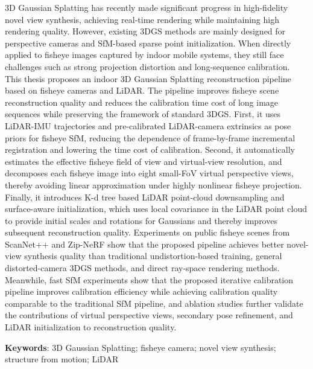 3D Gaussian Splatting has recently made significant progress in high-fidelity novel view synthesis, achieving real-time rendering while maintaining high rendering quality.
However, existing 3DGS methods are mainly designed for perspective cameras and SfM-based sparse point initialization. When directly applied to fisheye images captured by indoor mobile systems, they still face challenges such as strong projection distortion and long-sequence calibration. 
This thesis proposes an indoor 3D Gaussian Splatting reconstruction pipeline based on fisheye cameras and LiDAR. 
The pipeline improves fisheye scene reconstruction quality and reduces the calibration time cost of long image sequences while preserving the framework of standard 3DGS. 
First, it uses LiDAR-IMU trajectories and pre-calibrated LiDAR-camera extrinsics as pose priors for fisheye SfM, reducing the dependence of frame-by-frame incremental registration and lowering the time cost of calibration. 
Second, it automatically estimates the effective fisheye field of view and virtual-view resolution, and decomposes each fisheye image into eight small-FoV virtual perspective views, thereby avoiding linear approximation under highly nonlinear fisheye projection. 
Finally, it introduces K-d tree based LiDAR point-cloud downsampling and surface-aware initialization, which uses local covariance in the LiDAR point cloud to provide initial scales and rotations for Gaussians and thereby improves subsequent reconstruction quality. 
Experiments on public fisheye scenes from ScanNet++ and Zip-NeRF show that the proposed pipeline achieves better novel-view synthesis quality than traditional undistortion-based training, general distorted-camera 3DGS methods, and direct ray-space rendering methods. 
Meanwhile, fast SfM experiments show that the proposed iterative calibration pipeline improves calibration efficiency while achieving calibration quality comparable to the traditional SfM pipeline, 
and ablation studies further validate the contributions of virtual perspective views, secondary pose refinement, and LiDAR initialization to reconstruction quality.

\vspace{-0.05em}
\noindent \textbf{Keywords}: 3D Gaussian Splatting; fisheye camera; novel view synthesis; structure from motion; LiDAR
